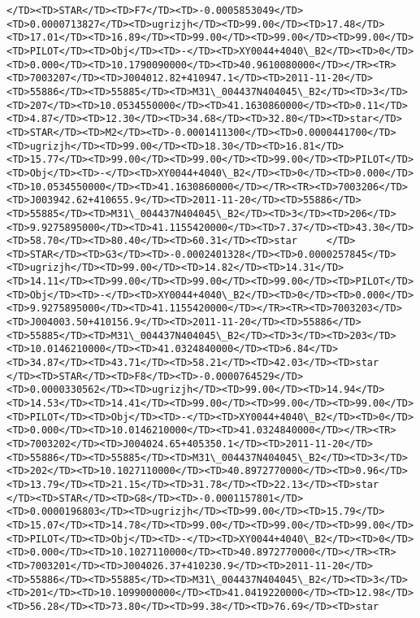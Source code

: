 \documentclass[11pt]{article}
\begin{document}
\begin{Verbatim}[commandchars=\\\{\}]
</TD><TD>STAR</TD><TD>F7</TD><TD>-0.0005853049</TD><TD>0.0000713827</TD><TD>ugrizjh</TD><TD>99.00</TD><TD>17.48</TD><TD>17.01</TD><TD>16.89</TD><TD>99.00</TD><TD>99.00</TD><TD>99.00</TD><TD>PILOT</TD><TD>Obj</TD><TD>-</TD><TD>XY0044+4040\_B2</TD><TD>0</TD><TD>0.000</TD><TD>10.1790090000</TD><TD>40.9610080000</TD></TR><TR><TD>7003207</TD><TD>J004012.82+410947.1</TD><TD>2011-11-20</TD><TD>55886</TD><TD>55885</TD><TD>M31\_004437N404045\_B2</TD><TD>3</TD><TD>207</TD><TD>10.0534550000</TD><TD>41.1630860000</TD><TD>0.11</TD><TD>4.87</TD><TD>12.30</TD><TD>34.68</TD><TD>32.80</TD><TD>star</TD><TD>STAR</TD><TD>M2</TD><TD>-0.0001411300</TD><TD>0.0000441700</TD><TD>ugrizjh</TD><TD>99.00</TD><TD>18.30</TD><TD>16.81</TD><TD>15.77</TD><TD>99.00</TD><TD>99.00</TD><TD>99.00</TD><TD>PILOT</TD><TD>Obj</TD><TD>-</TD><TD>XY0044+4040\_B2</TD><TD>0</TD><TD>0.000</TD><TD>10.0534550000</TD><TD>41.1630860000</TD></TR><TR><TD>7003206</TD><TD>J003942.62+410655.9</TD><TD>2011-11-20</TD><TD>55886</TD><TD>55885</TD><TD>M31\_004437N404045\_B2</TD><TD>3</TD><TD>206</TD><TD>9.9275895000</TD><TD>41.1155420000</TD><TD>7.37</TD><TD>43.30</TD><TD>58.70</TD><TD>80.40</TD><TD>60.31</TD><TD>star     </TD><TD>STAR</TD><TD>G3</TD><TD>-0.0002401328</TD><TD>0.0000257845</TD><TD>ugrizjh</TD><TD>99.00</TD><TD>14.82</TD><TD>14.31</TD><TD>14.11</TD><TD>99.00</TD><TD>99.00</TD><TD>99.00</TD><TD>PILOT</TD><TD>Obj</TD><TD>-</TD><TD>XY0044+4040\_B2</TD><TD>0</TD><TD>0.000</TD><TD>9.9275895000</TD><TD>41.1155420000</TD></TR><TR><TD>7003203</TD><TD>J004003.50+410156.9</TD><TD>2011-11-20</TD><TD>55886</TD><TD>55885</TD><TD>M31\_004437N404045\_B2</TD><TD>3</TD><TD>203</TD><TD>10.0146210000</TD><TD>41.0324840000</TD><TD>6.84</TD><TD>34.87</TD><TD>43.71</TD><TD>58.21</TD><TD>42.03</TD><TD>star     </TD><TD>STAR</TD><TD>F8</TD><TD>-0.0000764529</TD><TD>0.0000330562</TD><TD>ugrizjh</TD><TD>99.00</TD><TD>14.94</TD><TD>14.53</TD><TD>14.41</TD><TD>99.00</TD><TD>99.00</TD><TD>99.00</TD><TD>PILOT</TD><TD>Obj</TD><TD>-</TD><TD>XY0044+4040\_B2</TD><TD>0</TD><TD>0.000</TD><TD>10.0146210000</TD><TD>41.0324840000</TD></TR><TR><TD>7003202</TD><TD>J004024.65+405350.1</TD><TD>2011-11-20</TD><TD>55886</TD><TD>55885</TD><TD>M31\_004437N404045\_B2</TD><TD>3</TD><TD>202</TD><TD>10.1027110000</TD><TD>40.8972770000</TD><TD>0.96</TD><TD>13.79</TD><TD>21.15</TD><TD>31.78</TD><TD>22.13</TD><TD>star     </TD><TD>STAR</TD><TD>G8</TD><TD>-0.0001157801</TD><TD>0.0000196803</TD><TD>ugrizjh</TD><TD>99.00</TD><TD>15.79</TD><TD>15.07</TD><TD>14.78</TD><TD>99.00</TD><TD>99.00</TD><TD>99.00</TD><TD>PILOT</TD><TD>Obj</TD><TD>-</TD><TD>XY0044+4040\_B2</TD><TD>0</TD><TD>0.000</TD><TD>10.1027110000</TD><TD>40.8972770000</TD></TR><TR><TD>7003201</TD><TD>J004026.37+410230.9</TD><TD>2011-11-20</TD><TD>55886</TD><TD>55885</TD><TD>M31\_004437N404045\_B2</TD><TD>3</TD><TD>201</TD><TD>10.1099000000</TD><TD>41.0419220000</TD><TD>12.98</TD><TD>56.28</TD><TD>73.80</TD><TD>99.38</TD><TD>76.69</TD><TD>star     
\end{Verbatim}
\end{document}
